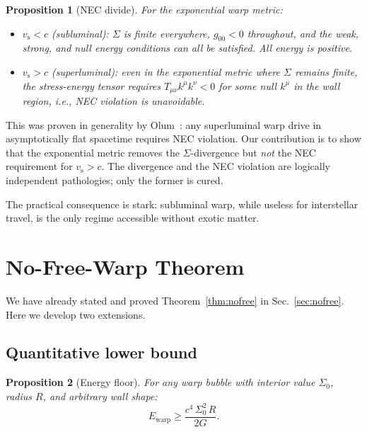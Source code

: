 \documentclass[prd,twocolumn,superscriptaddress,longbibliography]{revtex4-2}
\newcommand{\vs}{v_{\mathrm{s}}}
\newcommand{\Ewarp}{E_{\mathrm{warp}}}
\newtheorem{proposition}{Proposition}
\begin{document}
\begin{proposition}[NEC divide]
\label{prop:NEC}
For the exponential warp metric:
\begin{itemize}
\item $\vs < c$ (subluminal): $\Sigma$ is finite everywhere,
$g_{00} < 0$ throughout, and the weak, strong, and null
energy conditions can all be satisfied.  All energy is positive.
\item $\vs > c$ (superluminal): even in the exponential metric
where $\Sigma$ remains finite, the stress-energy tensor requires
$T_{\mu\nu}k^\mu k^\nu < 0$ for some null $k^\mu$ in the
wall region, i.e., NEC violation is unavoidable.
\end{itemize}
\end{proposition}

This was proven in generality by Olum~\cite{Olum1998}: any
superluminal warp drive in asymptotically flat spacetime requires
NEC violation.  Our contribution is to show that the exponential
metric removes the $\Sigma$-divergence but \emph{not} the NEC
requirement for $\vs > c$.  The divergence and the NEC violation
are logically independent pathologies; only the former is cured.

The practical consequence is stark: subluminal warp, while
useless for interstellar travel, is the only regime accessible
without exotic matter.

\section{No-Free-Warp Theorem}

We have already stated and proved Theorem~\ref{thm:nofree}
in Sec.~\ref{sec:nofree}.  Here we develop two extensions.

\subsection{Quantitative lower bound}

\begin{proposition}[Energy floor]
For any warp bubble with interior value $\Sigma_0$, radius $R$,
and arbitrary wall shape:
\begin{equation}
\label{eq:energy_floor}
\Ewarp \geq \frac{c^4\,\Sigma_0^2\,R}{2G}.
\end{equation}
\end{proposition}
\end{document}
